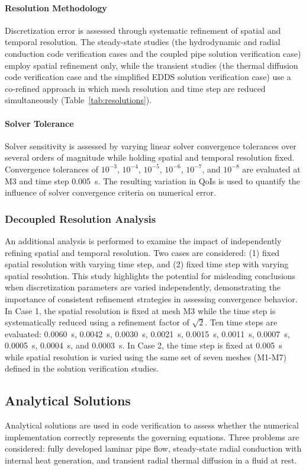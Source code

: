 \paragraph{Resolution Methodology}
Discretization error is assessed through systematic refinement of spatial and temporal resolution. The steady-state studies (the hydrodynamic and radial conduction code verification cases and the coupled pipe solution verification case) employ spatial refinement only, while the transient studies (the thermal diffusion code verification case and the simplified EDDS solution verification case) use a co-refined approach in which mesh resolution and time step are reduced simultaneously (Table~\ref{tab:resolutions}).

\paragraph{Solver Tolerance} 
Solver sensitivity is assessed by varying linear solver convergence tolerances over several orders of magnitude while holding spatial and temporal resolution fixed. Convergence tolerances of $10^{-3}$, $10^{-4}$, $10^{-5}$, $10^{-6}$, $10^{-7}$, and $10^{-8}$ are evaluated at M3 and time step 0.005~s. The resulting variation in QoIs is used to quantify the influence of solver convergence criteria on numerical error. 

\subsubsection{Decoupled Resolution Analysis}
An additional analysis is performed to examine the impact of independently refining spatial and temporal resolution. Two cases are considered: (1) fixed spatial resolution with varying time step, and (2) fixed time step with varying spatial resolution. This study highlights the potential for misleading conclusions when discretization parameters are varied independently, demonstrating the importance of consistent refinement strategies in assessing convergence behavior. In Case 1, the spatial resolution is fixed at mesh M3 while the time step is systematically reduced using a refinement factor of $\sqrt{2}$. Ten time steps are evaluated: 0.0060~s, 0.0042~s, 0.0030~s, 0.0021~s, 0.0015~s, 0.0011~s, 0.0007~s, 0.0005~s, 0.0004~s, and 0.0003~s. In Case 2, the time step is fixed at 0.005~s while spatial resolution is varied using the same set of seven meshes (M1-M7) defined in the solution verification studies.

\subsection{Analytical Solutions}
\label{subsec:analytical}
Analytical solutions are used in code verification to assess whether the numerical implementation correctly represents the governing equations. Three problems are considered: fully developed laminar pipe flow, steady-state radial conduction with internal heat generation, and transient radial thermal diffusion in a fluid at rest.

